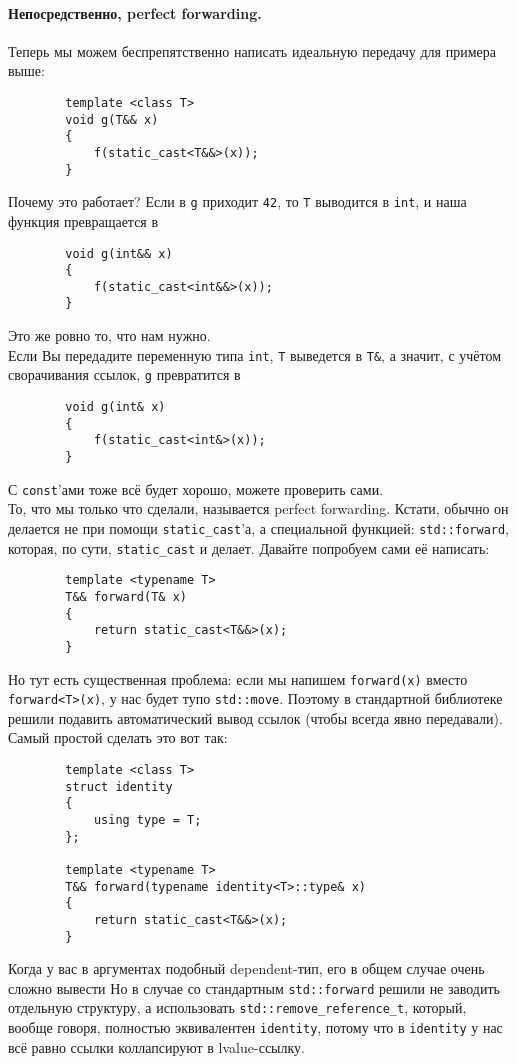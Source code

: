 \documentclass{article}
\begin{document}
    \paragraph{Непосредственно, perfect forwarding.}
    Теперь мы можем беспрепятственно написать идеальную передачу для примера выше:
    \begin{verbatim}
        template <class T>
        void g(T&& x)
        {
            f(static_cast<T&&>(x));
        }
    \end{verbatim}
    Почему это работает? Если в \texttt{g} приходит \texttt{42}, то \texttt{T} выводится в \texttt{int}, и наша функция превращается в
    \begin{verbatim}
        void g(int&& x)
        {
            f(static_cast<int&&>(x));
        }
    \end{verbatim}
    Это же ровно то, что нам нужно.\\
    Если Вы передадите переменную типа \texttt{int}, \texttt{T} выведется в \texttt{T&}, а значит, с учётом сворачивания ссылок, \texttt{g} превратится в
    \begin{verbatim}
        void g(int& x)
        {
            f(static_cast<int&>(x));
        }
    \end{verbatim}
    С \texttt{const}'ами тоже всё будет хорошо, можете проверить сами.\\
    То, что мы только что сделали, называется perfect forwarding. Кстати, обычно он делается не при помощи \texttt{static_cast}'а, а специальной функцией: \texttt{std::forward}, которая, по сути, \texttt{static_cast} и делает. Давайте попробуем сами её написать:
    \begin{verbatim}
        template <typename T>
        T&& forward(T& x)
        {
            return static_cast<T&&>(x);
        }
    \end{verbatim}
    Но тут есть существенная проблема: если мы напишем \texttt{forward(x)} вместо \texttt{forward<T>(x)}, у нас будет тупо \texttt{std::move}. Поэтому в стандартной библиотеке решили подавить автоматический вывод ссылок (чтобы всегда явно передавали). Самый простой сделать это вот так:
    \begin{verbatim}
        template <class T>
        struct identity
        {
            using type = T;
        };

        template <typename T>
        T&& forward(typename identity<T>::type& x)
        {
            return static_cast<T&&>(x);
        }
    \end{verbatim}
    Когда у вас в аргументах подобный dependent-тип, его в общем случае очень сложно вывести Но в случае со стандартным \texttt{std::forward} решили не заводить отдельную структуру, а использовать \texttt{std::remove_reference_t}, который, вообще говоря, полностью эквивалентен \texttt{identity}, потому что в \texttt{identity} у нас всё равно ссылки коллапсируют в lvalue-ссылку.
\end{document}
